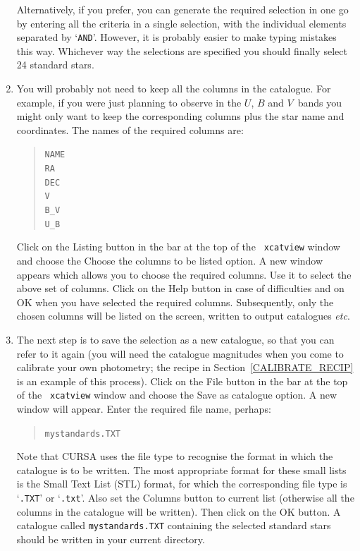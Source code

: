 \documentclass[twoside,11pt]{article}
\begin{document}
\begin{enumerate}
   Alternatively, if you prefer, you can generate the required selection
   in one go by entering all the criteria in a single selection, with
   the individual elements separated by `{\tt AND}'.  However, it is
   probably easier to make typing mistakes this way.  Whichever way the
   selections are specified you should finally select 24 standard stars.

  \item You will probably not need to keep all the columns in the
   catalogue.  For example, if you were just planning to observe in
   the $U$, $B$ and $V$\, bands you might only want to keep the
   corresponding columns plus the star name and coordinates.  The names
   of the required columns are:

  \begin{verse}
   {\tt NAME  \\
   RA         \\
   DEC        \\
   V          \\
   B\_V       \\
   U\_B}
  \end{verse}

   Click on the {\sf Listing} button in the bar at the top of the {\tt
   xcatview} window and choose the {\sf Choose the columns to be listed}
   option.  A new window appears which allows you to choose the
   required columns.  Use it to select the above set of columns.  Click
   on the {\sf Help} button in case of difficulties and on {\sf OK}
   when you have selected the required columns.  Subsequently, only the
   chosen columns will be listed on the screen, written to output
   catalogues \emph{etc}.

  \item The next step is to save the selection as a new catalogue, so
   that you can refer to it again (you will need the catalogue magnitudes
   when you come to calibrate your own photometry; the recipe in
   Section~\ref{CALIBRATE_RECIP} is an example of this process).
   Click on the {\sf File} button in the bar at the top of the {\tt
   xcatview} window and choose the {\sf Save as catalogue} option.  A
   new window will appear.  Enter the required file name, perhaps:

  \begin{verse}
   {\tt mystandards.TXT}
  \end{verse}

   Note that CURSA uses the file type to recognise the format in which
   the catalogue is to be written.  The most appropriate format for
   these small lists is the Small Text List (STL) format, for which the
   corresponding file type is `{\tt .TXT}' or `{\tt .txt}'.  Also set
   the {\sf Columns} button to {\sf current list} (otherwise all the
   columns in the catalogue will be written).  Then click on the {\sf OK}
   button.  A catalogue called {\tt mystandards.TXT} containing the
   selected standard stars should be written in your current directory.


\end{enumerate}
\end{document}
